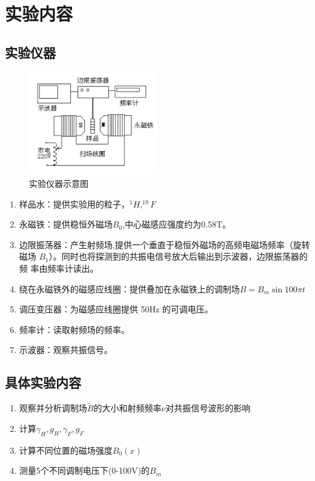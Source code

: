 \documentclass[a4paper,UTF8]{ctexart}
\begin{document}
\section{实验内容}

\subsection{实验仪器}

\begin{figure}[H]
    \centering
    \begin{minipage}[b]{0.9\textwidth}
        \centering
        \includegraphics[width=0.5\textwidth]{./equip.png}
        \caption{实验仪器示意图}
    \end{minipage}
\end{figure}

\begin{enumerate}
    \item 样品水：提供实验用的粒子，$^1H,^{19}F$
    \item 永磁铁：提供稳恒外磁场$B_0$,中心磁感应强度约为0.58T。
    \item 边限振荡器：产生射频场,提供一个垂直于稳恒外磁场的高频电磁场频率（旋转
磁场 $B_1$）。同时也将探测到的共振电信号放大后输出到示波器，边限振荡器的频
率由频率计读出。
    \item 绕在永磁铁外的磁感应线圈：提供叠加在永磁铁上的调制场$B =B_m\sin{100\pi t}$
    \item 调压变压器：为磁感应线圈提供 50Hz 的可调电压。
    \item 频率计：读取射频场的频率。
    \item 示波器：观察共振信号。
\end{enumerate}

\subsection{具体实验内容}

\begin{enumerate}
    \item 观察并分析调制场$\tilde{B}$的大小和射频频率$\nu$对共振信号波形的影响
    \item 计算$\gamma_H,g_H,\gamma_F,g_F$
    \item 计算不同位置的磁场强度$B_0(x)$
    \item 测量5个不同调制电压下(0-100V)的$B_m$
\end{enumerate}
\end{document}
